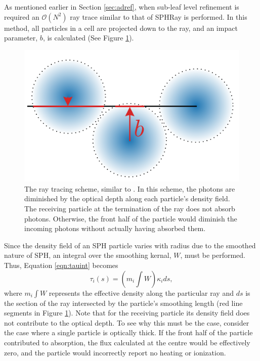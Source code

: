 \documentclass[fleq,usenatbib]{mnras}
\newcommand{\bigO}[1]{\mathcal{O}\left(#1\right)}
\begin{document}
As mentioned earlier in Section \ref{sec:adref}, when sub-leaf level 
refinement is required an $\bigO{N^2}$ ray trace similar to that of 
SPHRay is performed. In this method, all particles in a cell are projected 
down to the ray, and an impact parameter, $b$, is calculated (See Figure
\ref{fig:raytrace}).
\begin{figure}
\includegraphics[width=1\linewidth]{Figures/raytrace.pdf}
\caption{The ray tracing scheme, similar to \protect\cite{altayEt08}. In this 
scheme, the photons are diminished by the optical depth along each particle's 
density field. The receiving particle at the termination of the ray does not 
absorb photons. Otherwise, the front half of the particle would diminish the 
incoming photons without actually having absorbed them.} 
\label{fig:raytrace}
\end{figure}
Since the density field of an SPH particle varies with radius due to the 
smoothed nature of SPH, an integral over the smoothing kernal, $W$, must be 
performed. Thus, Equation \ref{eqn:tauint} becomes 
\begin{equation}
\tau_i(s) = \left(m_i\int W\right) \kappa_i ds,
\end{equation}
where $m_i \int W$ represents the effective density along the particular ray 
and $ds$ is the section of the ray intersected by the particle's smoothing 
length (red line segments in Figure \ref{fig:raytrace}). Note that for the 
receiving particle its density field does not contribute to the optical depth.
To see why this must be the case, consider the case where a single particle is
optically thick. If the front half of the particle  contributed to absorption,
the flux calculated at the centre would be effectively zero, and the particle 
would incorrectly report no heating or ionization. 
\end{document}
